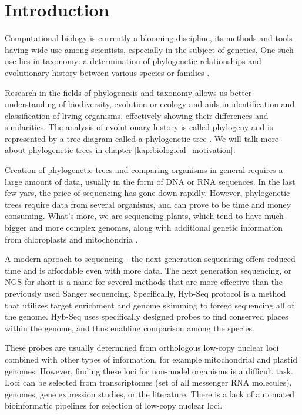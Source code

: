 \chapter*{Introduction} %

Computational biology is currently a blooming discipline, its methods and tools having wide use 
among scientists, especially in the subject of genetics. One such use lies in taxonomy: a determination of 
phylogenetic relationships and evolutionary history between various species or families \cite{phylogenetics}. 

Research in the fields of phylogenesis and taxonomy allows us better understanding of biodiversity, evolution 
or ecology and aids in identification and classification of living organisms, effectively showing their differences 
and similarities. The analysis of evolutionary history is called phylogeny and is represented by a tree diagram 
called a phylogenetic tree \cite{phylogenetic_tree}. We will talk more about phylogenetic trees in chapter 
\ref{kap:biological_motivation}. 

Creation of phylogenetic trees and comparing organisms in general requires a large amount of data, usually 
in the form of DNA or RNA sequences. In the last few yars, the price of sequencing has gone down rapidly. However, 
phylogenetic trees require data from several organisms, and can prove to be time and money consuming. What's more, 
we are sequencing plants, which tend to have much bigger and more complex genomes, along with additional genetic 
information from chloroplasts and mitochondria \cite{schatz2012current}. 

A modern aproach to sequencing - the next generation sequencing offers reduced time and is affordable even with 
more data. The next generation sequencing, or NGS for short is a name for several methods that are more effective 
than the previously used Sanger sequencing. Specifically, Hyb-Seq protocol \cite{weitemier2014hyb} is a method 
that utilizes target enrichment and genome skimming to forego sequencing all of the genome. Hyb-Seq uses specifically 
designed probes to find conserved places within the genome, and thus enabling comparison among the species. 

These probes are usually determined from orthologous low-copy nuclear loci combined with other types of information, 
for example mitochondrial and plastid genomes. However, finding these loci for non-model organisms is a difficult task. 
Loci can be selected from transcriptomes (set of all messenger RNA molecules), genomes, gene expression studies, or the 
literature. There is a lack of automated bioinformatic pipelines for selection of low-copy nuclear loci.  

